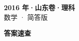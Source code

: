 \documentclass[zihao=-4, a4paper]{ctexart}
\begin{document}
\begin{center}
  {\Large\bfseries 2016 年·山东卷·理科}\\[4pt]
  {\large 数学 · 简答版}
\end{center}
\medskip
{}

\clearpage
{}
\begin{center}{\Large\bfseries 答案速查}\end{center}
\medskip

\end{document}
